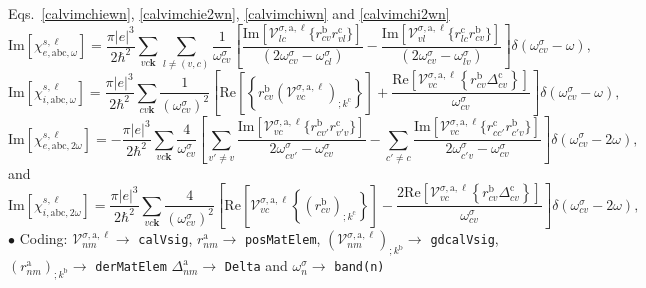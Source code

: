 Eqs.~\eqref{calvimchiewn}, \eqref{calvimchie2wn}, \eqref{calvimchiwn}
 and \eqref{calvimchi2wn}
\begin{equation}\label{calvimchiewn}
\mathrm{Im}[\chi_{e,\mathrm{a}\mathrm{b}\mathrm{c},\omega}^{s,\ell}] =
\frac{\pi |e|^3}{2\hbar^2}\sum_{vc\mathbf{k}}\sum_{l\neq(v,c)}\frac{1}{\omega^\sigma_{cv}}
\left[
\frac{\mathrm{Im}[\mathcal{V}^{\sigma,\text{a},\ell}_{lc}\{r^{\mathrm{b}}_{cv}r^{\mathrm{c}}_{vl}\}]}
{(2\omega^\sigma_{cv}-\omega^\sigma_{cl})} 
-\frac{\mathrm{Im}[\mathcal{V}^{\sigma,\text{a},\ell}_{vl}\{r^{\mathrm{c}}_{lc}r^{\mathrm{b}}_{cv}\}]}
{(2\omega^\sigma_{cv}-\omega^\sigma_{lv})}
\right]\delta(\omega^\sigma_{cv}-\omega),
\end{equation}  
\begin{equation}\label{calvimchiwn}
\mathrm{Im}[\chi_{i,\text{a}\text{b}\text{c},\omega}^{s,\ell}]
= \frac{\pi\vert e\vert^3}{2\hbar^2}\sum_{cv\mathbf{k}}\frac{1}{(\omega^\sigma_{cv})^{2}}
\left[
\mathrm{Re}\left[\left\{r^{\text{b}}_{cv}\left(\mathcal{V}^{\sigma,\text{a},\ell}_{vc}\right)_{;k^{\text{c}}}\right\}\right]
+\frac{\mathrm{Re}\left[\mathcal{V}^{\sigma,\text{a},\ell}_{vc}\left\{r^{\text{b}}_{cv}
\Delta^{\text{c}}_{cv}\right\}\right]}{\omega^\sigma_{cv}} 
\right]\delta(\omega^\sigma_{cv}-\omega),
\end{equation}
\begin{equation}\label{calvimchie2wn}
\mathrm{Im}[\chi_{e,\mathrm{a}\mathrm{b}\mathrm{c},2\omega}^{s,\ell}] =
-\frac{\pi |e|^3}{2\hbar^2}\sum_{vc\mathbf{k}}\frac{4}{\omega^\sigma_{cv}}
\left[
\sum_{v'\ne
  v}\frac{\mathrm{Im}[\mathcal{V}^{\sigma,\text{a},\ell}_{vc}\{r^{\mathrm{b}}_{cv'}r^{\mathrm{c}}_{v'v}\}]}
{2\omega^\sigma_{cv'}-\omega^\sigma_{cv}}
- \sum_{c'\ne
  c}\frac{\mathrm{Im}[\mathcal{V}^{\sigma,\text{a},\ell}_{vc}\{r^{\mathrm{c}}_{cc'}r^{\mathrm{b}}_{c'v}\}]}
{2\omega^\sigma_{c'v}-\omega^\sigma_{cv}}
\right]\delta(\omega^\sigma_{cv}-2\omega),
\end{equation}
and
\begin{equation}\label{calvimchi2wn}
\mathrm{Im}[\chi_{i,\text{a}\text{b}\text{c},2\omega}^{s,\ell}] 
=
 \frac{\pi \vert
   e\vert^{3}}{2\hbar^2}\sum_{vc\mathbf{k}}\frac{4}{(\omega^\sigma_{cv})^{2}}
\left[\mathrm{Re}\left[\mathcal{V}^{\sigma,\text{a},\ell}_{vc}\left\{\left(r^{\text{b}}_{cv}\right)_{;k^{\text{c}}}
\right\}\right] -
\frac{2\mathrm{Re}\left[\mathcal{V}^{\sigma,\text{a},\ell}_{vc}\left\{r^{\text{b}}_{cv}
\Delta^{\text{c}}_{cv}\right\}\right]}{\omega^\sigma_{cv}}\right]\delta(\omega^\sigma_{cv}-2\omega)
,
\end{equation}
\noindent$\bullet$ Coding:
$\mathcal{V}^{\sigma,\mathrm{a},\ell}_{nm}\to$ \verb=calVsig=,
$r^\mathrm{a}_{nm}\to$ \verb=posMatElem=,
$\left(\mathcal{V}^{\sigma,\mathrm{a},\ell}_{nm}\right)_{;k^\mathrm{b}}\to$ \verb=gdcalVsig=,
\\ $(r^\mathrm{a}_{nm})_{;k^\mathrm{b}}\to$ \verb=derMatElem= 
$\Delta^\mathrm{a}_{nm}\to$ \verb=Delta= and $\omega^\sigma_n\to$ \verb=band(n)=

